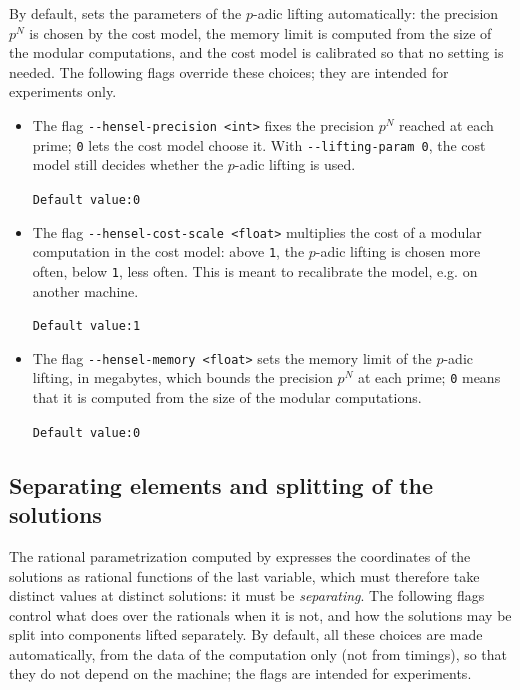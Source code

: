 \documentclass[a4paper,english,11pt]{scrartcl}
\theoremstyle{definition}
\theoremstyle{remark}
\begin{document}
By default, \msolve sets the parameters of the $p$-adic lifting
automatically: the precision $p^N$ is chosen by the cost model, the memory
limit is computed from the size of the modular computations, and the cost
model is calibrated so that no setting is needed. The following flags
override these choices; they are intended for experiments only.

\begin{itemize}
\item The flag \verb+--hensel-precision <int>+ fixes the precision $p^N$
  reached at each prime; \verb+0+ lets the cost model choose it. With
  \verb+--lifting-param 0+, the cost model still decides whether the
  $p$-adic lifting is used.

  \hfill \verb+Default value:0+

\item The flag \verb+--hensel-cost-scale <float>+ multiplies the cost of a
  modular computation in the cost model: above \verb+1+, the $p$-adic lifting
  is chosen more often, below \verb+1+, less often. This is meant to
  recalibrate the model, e.g. on another machine.

  \hfill \verb+Default value:1+

\item The flag \verb+--hensel-memory <float>+ sets the memory limit of the
  $p$-adic lifting, in megabytes, which bounds the precision $p^N$ at each
  prime; \verb+0+ means that it is computed from the size of the modular
  computations.

  \hfill \verb+Default value:0+
\end{itemize}

\subsection{Separating elements and splitting of the solutions}\label{sec:separating}

The rational parametrization computed by \msolve expresses the coordinates
of the solutions as rational functions of the last variable, which must
therefore take distinct values at distinct solutions: it must be
\emph{separating}. The following flags control what \msolve does over the
rationals when it is not, and how the solutions may be split into
components lifted separately. By default, all these choices are made
automatically, from the data of the computation only (not from timings),
so that they do not depend on the machine; the flags are intended for
experiments.
\end{document}
